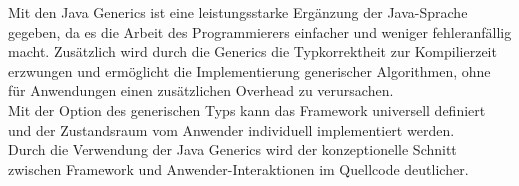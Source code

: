     Mit den Java Generics ist eine leistungsstarke Ergänzung der Java-Sprache gegeben, da es die Arbeit des Programmierers einfacher und 
    weniger fehleranfällig macht. Zusätzlich wird durch die Generics die Typkorrektheit zur Kompilierzeit erzwungen und ermöglicht 
    die Implementierung generischer Algorithmen, ohne für Anwendungen einen zusätzlichen Overhead zu verursachen. 
    \\
    Mit der Option des generischen Typs kann das Framework universell definiert und der Zustandsraum vom Anwender individuell implementiert werden.
    \\
    \linebreak
    Durch die Verwendung der Java Generics wird der konzeptionelle Schnitt zwischen Framework und Anwender-Interaktionen im Quellcode deutlicher.

